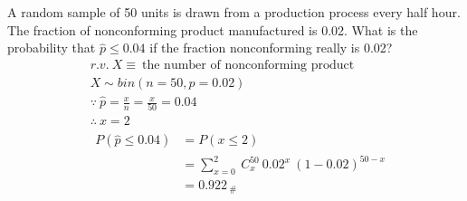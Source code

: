 A random sample of 50 units is drawn from a production process every half hour. The fraction of nonconforming product manufactured is 0.02. What is the probability that $\hat{p} \leq 0.04$ if the fraction nonconforming really is 0.02?
    \begin{align*}
        &r.v. \ X \equiv \ \text{the number of nonconforming product}\\
        &X \sim bin(n = 50, p = 0.02)\\
        &\because \ \hat{p} = \frac{x}{n} = \frac{x}{50} = 0.04\\
        &\therefore \ x = 2\\
        &\begin{aligned}
            P(\hat{p} \leq 0.04) &= P(x \leq 2)\\
            &= \sum_{x = 0}^{2} \ C_{x}^{50} \ 0.02^x \ (1 - 0.02)^{50 - x}\\
            &= 0.922_{ \ \#}\\
        \end{aligned}       
    \end{align*}